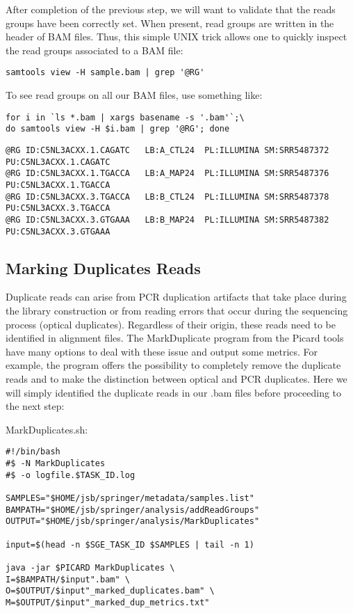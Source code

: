 After completion of the previous step, we will want to validate that the reads groups have been correctly set. When present, read groups are written in the header of BAM files. Thus, this simple UNIX trick allows one to quickly inspect the read groups associated to a BAM file:

\begin{verbatim}
samtools view -H sample.bam | grep '@RG'	
\end{verbatim}


To see read groups on all our BAM files, use something like:

\begin{verbatim}
for i in `ls *.bam | xargs basename -s '.bam'`;\
do samtools view -H $i.bam | grep '@RG'; done
\end{verbatim}

\begin{small}
\begin{verbatim}
@RG	ID:C5NL3ACXX.1.CAGATC	LB:A_CTL24	PL:ILLUMINA	SM:SRR5487372	PU:C5NL3ACXX.1.CAGATC
@RG	ID:C5NL3ACXX.1.TGACCA	LB:A_MAP24	PL:ILLUMINA	SM:SRR5487376	PU:C5NL3ACXX.1.TGACCA
@RG	ID:C5NL3ACXX.3.TGACCA	LB:B_CTL24	PL:ILLUMINA	SM:SRR5487378	PU:C5NL3ACXX.3.TGACCA
@RG	ID:C5NL3ACXX.3.GTGAAA	LB:B_MAP24	PL:ILLUMINA	SM:SRR5487382	PU:C5NL3ACXX.3.GTGAAA
\end{verbatim}
\end{small}






\subsection{Marking Duplicates Reads}


Duplicate reads can arise from PCR duplication artifacts that take place during the library construction or from reading errors that occur during the sequencing process (optical duplicates). Regardless of their origin, these reads need to be identified in alignment files. The MarkDuplicate program from the Picard tools have many options to deal with these issue and output some metrics. For example, the program offers the possibility to completely remove the duplicate reads and to make the distinction between optical and PCR duplicates. Here we will simply identified the duplicate reads in our .bam files before proceeding to the next step:

\noindent MarkDuplicates.sh:
\begin{verbatim}
#!/bin/bash
#$ -N MarkDuplicates
#$ -o logfile.$TASK_ID.log

SAMPLES="$HOME/jsb/springer/metadata/samples.list"
BAMPATH="$HOME/jsb/springer/analysis/addReadGroups"
OUTPUT="$HOME/jsb/springer/analysis/MarkDuplicates"

input=$(head -n $SGE_TASK_ID $SAMPLES | tail -n 1)

java -jar $PICARD MarkDuplicates \
I=$BAMPATH/$input".bam" \
O=$OUTPUT/$input"_marked_duplicates.bam" \
M=$OUTPUT/$input"_marked_dup_metrics.txt"
\end{verbatim}

